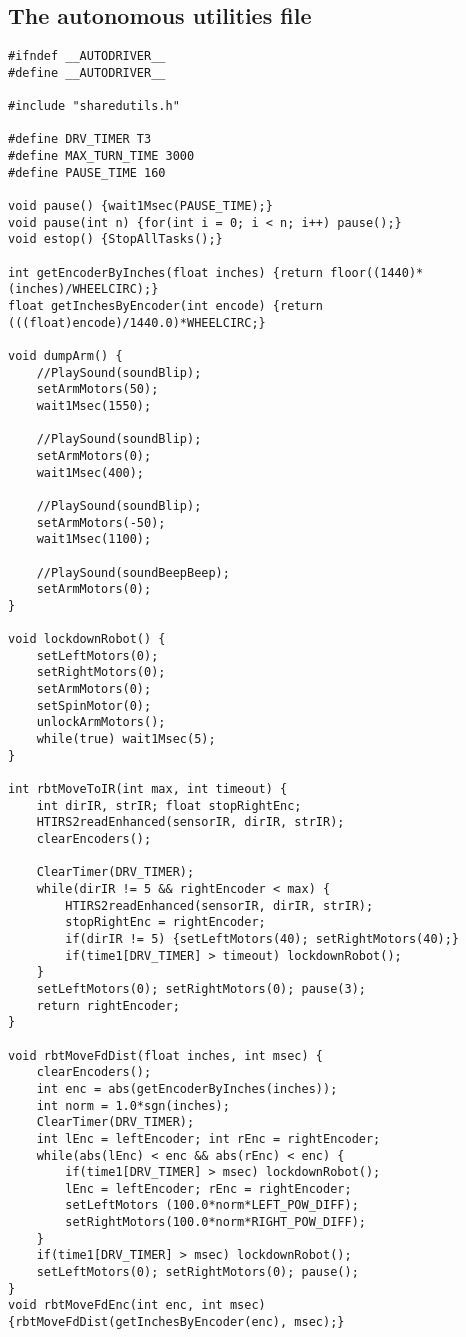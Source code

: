 \subsection{The autonomous utilities file}
\begin{lstlisting}
#ifndef __AUTODRIVER__
#define __AUTODRIVER__

#include "sharedutils.h"

#define DRV_TIMER T3
#define MAX_TURN_TIME 3000
#define PAUSE_TIME 160

void pause() {wait1Msec(PAUSE_TIME);}
void pause(int n) {for(int i = 0; i < n; i++) pause();}
void estop() {StopAllTasks();}

int getEncoderByInches(float inches) {return floor((1440)*(inches)/WHEELCIRC);}
float getInchesByEncoder(int encode) {return (((float)encode)/1440.0)*WHEELCIRC;}

void dumpArm() {
	//PlaySound(soundBlip);
	setArmMotors(50);
	wait1Msec(1550);

	//PlaySound(soundBlip);
	setArmMotors(0);
	wait1Msec(400);

	//PlaySound(soundBlip);
	setArmMotors(-50);
	wait1Msec(1100);

	//PlaySound(soundBeepBeep);
	setArmMotors(0);
}

void lockdownRobot() {
	setLeftMotors(0);
	setRightMotors(0);
	setArmMotors(0);
	setSpinMotor(0);
	unlockArmMotors();
	while(true) wait1Msec(5);
}

int rbtMoveToIR(int max, int timeout) {
	int dirIR, strIR; float stopRightEnc;
	HTIRS2readEnhanced(sensorIR, dirIR, strIR);
	clearEncoders();

	ClearTimer(DRV_TIMER);
	while(dirIR != 5 && rightEncoder < max) {
		HTIRS2readEnhanced(sensorIR, dirIR, strIR);
		stopRightEnc = rightEncoder;
		if(dirIR != 5) {setLeftMotors(40); setRightMotors(40);}
		if(time1[DRV_TIMER] > timeout) lockdownRobot();
	}
	setLeftMotors(0); setRightMotors(0); pause(3);
	return rightEncoder;
}

void rbtMoveFdDist(float inches, int msec) {
	clearEncoders();
	int enc = abs(getEncoderByInches(inches));
	int norm = 1.0*sgn(inches);
	ClearTimer(DRV_TIMER);
	int lEnc = leftEncoder; int rEnc = rightEncoder;
	while(abs(lEnc) < enc && abs(rEnc) < enc) {
		if(time1[DRV_TIMER] > msec) lockdownRobot();
		lEnc = leftEncoder; rEnc = rightEncoder;
		setLeftMotors (100.0*norm*LEFT_POW_DIFF);
		setRightMotors(100.0*norm*RIGHT_POW_DIFF);
	}
	if(time1[DRV_TIMER] > msec) lockdownRobot();
	setLeftMotors(0); setRightMotors(0); pause();
}
void rbtMoveFdEnc(int enc, int msec) {rbtMoveFdDist(getInchesByEncoder(enc), msec);}


\end{lstlisting}
